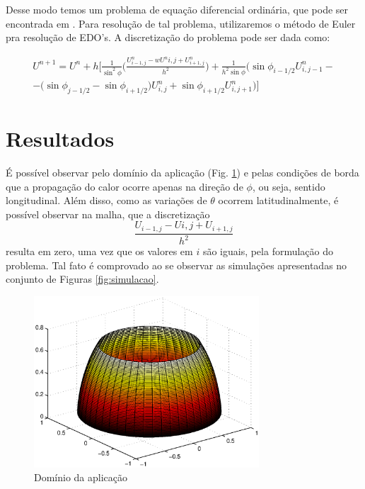 \documentclass{article}
\begin{document}
			Desse modo temos um problema de equação diferencial ordinária, que pode ser encontrada em \cite{burden2008analise}. Para resolução de tal problema, utilizaremos o método de Euler pra resolução de EDO's. A discretização do problema pode ser dada como:

			\begin{multline}
				U^{n+1} = U^n + h\bigg[ \frac{1}{\sin^2\phi}\bigg(\frac{U^n_{i-1,j}-wU^n{i,j} + U^n_{i+1,j}}{h^2}\bigg) + \frac{1}{h^2\sin\phi}\bigg(\sin\phi_{i-1/2}U^n_{i,j-1} - \\ - \bigg(\sin\phi_{j-1/2}-\sin\phi_{i+1/2}\bigg)U^n_{i,j} + \sin\phi_{i+1/2}U^n_{i,j+1}\bigg) \bigg]
			\end{multline}

	\section{Resultados}
		É possível observar pelo domínio da aplicação (Fig. \ref{fig:dominio}) e pelas condições de borda que a propagação do calor ocorre apenas na direção de $\phi$, ou seja, sentido longitudinal. Além disso, como as variações de $\theta$ ocorrem latitudinalmente, é possível observar na malha, que a discretização $$\frac{U_{i-1,j}-U{i,j} + U_{i+1,j}}{h^2}$$ resulta em zero, uma vez que os valores em $i$ são iguais, pela formulação do problema. Tal fato é comprovado ao se observar as simulações apresentadas no conjunto de Figuras \ref{fig:simulacao}.

		\begin{figure}
			\centering
			\includegraphics[width=0.75\textwidth]{image.eps}
			\caption{Domínio da aplicação}
			\label{fig:dominio}
		\end{figure}
\end{document}
